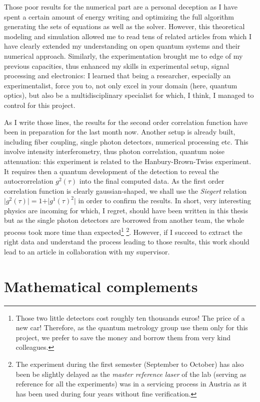 \documentclass[11pt]{report}
\begin{document}
Those poor results for the numerical part are a personal deception as I have spent a certain amount of energy writing and optimizing the full algorithm generating the sets of equations as well as the solver. However, this theoretical modeling and simulation allowed me to read tens of related articles from which I have clearly extended my understanding on open quantum systems and their numerical approach. Similarly, the experimentation brought me to edge of my previous capacities, thus enhanced my skills in experimental setup, signal processing and electronics: I learned that being a researcher, especially an experimentalist, force you to, not only excel in your domain (here, quantum optics), but also be a multidisciplinary specialist for which, I think, I managed to control for this project.

As I write those lines, the results for the second order correlation function have been in preparation for the last month now. Another setup is already built, including fiber coupling, single photon detectors, numerical processing etc. This involve intensity interferometry, thus photon correlation, quantum noise attenuation: this experiment is related to the Hanbury-Brown-Twiss experiment. It requires then a quantum development of the detection to reveal the autocrorrelation $g^2(\tau)$ into the final computed data. As the first order correlation function is clearly gaussian-shaped, we shall use the \textit{Siegert} relation $\vert g^2(\tau) \vert = 1 + \vert g^1(\tau)^2 \vert$ in order to confirm the results. In short, very interesting physics are incoming for which, I regret, should have been written in this thesis but as the single photon detectors are borrowed from another team, the whole process took more time than expected\footnote{Those two little detectors cost roughly ten thousands euros! The price of a new car! Therefore, as the quantum metrology group use them only for this project, we prefer to save the money and borrow them from very kind colleagues.} \footnote{The experiment during the first semester (September to October) has also been be slightly delayed as the \textit{master reference laser} of the lab (serving as reference for all the experiments) was in a servicing process in Austria as it has been used during four years without fine verification.}. However, if I succeed to extract the right data and understand the process leading to those results, this work should lead to an article in collaboration with my supervisor.

\appendix
\chapter{Mathematical complements}
\end{document}
